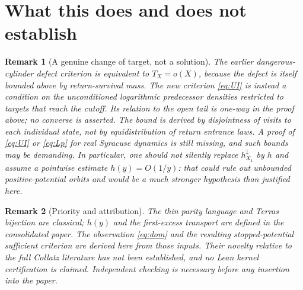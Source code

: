 \documentclass[11pt,a4paper]{article}
\newtheorem{remark}{Remark}
\newcommand{\1}{\mathbf 1}
\begin{document}
\section{What this does and does not establish}
\begin{remark}[A genuine change of target, not a solution]
The earlier dangerous-cylinder defect criterion is equivalent to $T_X=o(X)$, because the defect is itself bounded above by return-survival mass. The new criterion \eqref{eq:UI} is instead a condition on the \emph{unconditioned logarithmic predecessor densities} restricted to targets that reach the cutoff. Its relation to the open tail is one-way in the proof above; no converse is asserted. The bound is derived by disjointness of visits to each \emph{individual state}, not by equidistribution of return entrance laws. A proof of \eqref{eq:UI} or \eqref{eq:Lp} for real Syracuse dynamics is still missing, and such bounds may be demanding. In particular, one should not silently replace $h^{\downarrow}_{X_1}$ by $h$ and assume a pointwise estimate $h(y)=O(1/y)$: that could rule out unbounded positive-potential orbits and would be a much stronger hypothesis than justified here.
\end{remark}
\begin{remark}[Priority and attribution]
The thin parity language and Terras bijection are classical; $h(y)$ and the first-excess transport are defined in the consolidated paper. The observation \eqref{eq:dom} and the resulting stopped-potential sufficient criterion are derived here from those inputs. Their novelty relative to the full Collatz literature has \emph{not} been established, and no Lean kernel certification is claimed. Independent checking is necessary before any insertion into the paper.
\end{remark}
\end{document}
